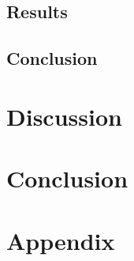 \documentclass[12p]{article}
\begin{document}
		\subsection{Results}
		\subsection{Conclusion}
		
		\newpage
		\section{Discussion} \label{Discussion}
		
		
		\newpage
		\section{Conclusion}
		
		
		\newpage
		\printbibliography[heading=bibintoc,title={References}]
		
		
		\newpage
		\appendix
		
		\section{Appendix}
		
		
\end{document}
